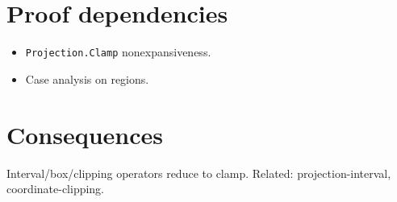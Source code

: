 \documentclass[12pt]{article}
\theoremstyle{plain}
\theoremstyle{definition}
\theoremstyle{remark}
\begin{document}
\section{Proof dependencies}
{\raggedright\sloppy
\begin{itemize}\item \texttt{Projection.Clamp} nonexpansiveness.\item Case analysis on regions.\end{itemize}
\par}

\section{Consequences}
{\raggedright\sloppy
Interval/box/clipping operators reduce to clamp. Related: projection-interval, coordinate-clipping.
\par}
\end{document}
